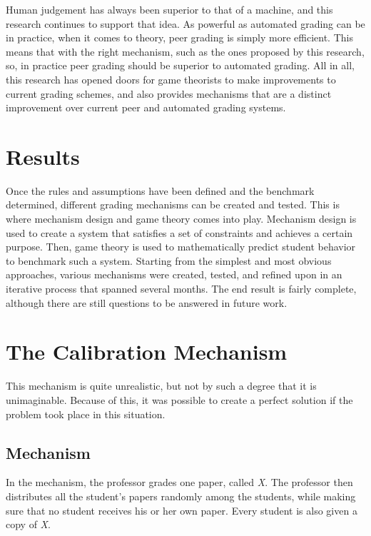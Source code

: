 \documentclass[12pt, Arial]{article}
\begin{document}
Human judgement has always been superior to that of a machine, and this research continues to support that idea. As powerful as automated grading can be in practice, when it comes to theory, peer grading is simply more efficient. This means that with the right mechanism, such as the ones proposed by this research, so, in practice peer grading should be superior to automated grading. All in all, this research has opened doors for game theorists to make improvements to current grading schemes, and also provides mechanisms that are a distinct improvement over current peer and automated grading systems.
\section{Results}
Once the rules and assumptions have been defined and the benchmark determined, different grading mechanisms can be created and tested. This is where mechanism design and game theory comes into play. Mechanism design is used to create a system that satisfies a set of constraints and achieves a certain purpose. Then, game theory is used to mathematically predict student behavior to benchmark such a system. Starting from the simplest and most obvious approaches, various mechanisms were created, tested, and refined upon in an iterative process that spanned several months. The end result is fairly complete, although there are still questions to be answered in future work.

\section{The Calibration Mechanism}

This mechanism is quite unrealistic, but not by such a degree that it is unimaginable. Because of this, it was possible to create a perfect solution if the problem took place in this situation.

\subsection{Mechanism}
In the mechanism, the professor grades one paper, called \emph{X}. The professor then distributes all the student's papers randomly among the students, while making sure that no student receives his or her own paper. Every student is also given a copy of \emph{X}.
\end{document}
